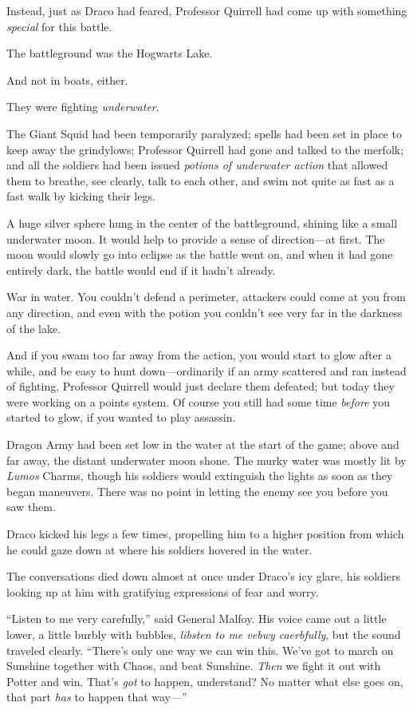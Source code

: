Instead, just as Draco had feared, Professor Quirrell had come up with something \emph{special} for this battle.

The battleground was the Hogwarts Lake.

And not in boats, either.

They were fighting \emph{underwater}.

The Giant Squid had been temporarily paralyzed; spells had been set in place to keep away the grindylows; Professor Quirrell had gone and talked to the merfolk; and all the soldiers had been issued \emph{potions of underwater action} that allowed them to breathe, see clearly, talk to each other, and swim not quite as fast as a fast walk by kicking their legs.

A huge silver sphere hung in the center of the battleground, shining like a small underwater moon. It would help to provide a sense of direction—at first. The moon would slowly go into eclipse as the battle went on, and when it had gone entirely dark, the battle would end if it hadn’t already.

War in water. You couldn’t defend a perimeter, attackers could come at you from any direction, and even with the potion you couldn’t see very far in the darkness of the lake.

And if you swam too far away from the action, you would start to glow after a while, and be easy to hunt down—ordinarily if an army scattered and ran instead of fighting, Professor Quirrell would just declare them defeated; but today they were working on a points system. Of course you still had some time \emph{before} you started to glow, if you wanted to play assassin.

Dragon Army had been set low in the water at the start of the game; above and far away, the distant underwater moon shone. The murky water was mostly lit by \emph{Lumos} Charms, though his soldiers would extinguish the lights as soon as they began maneuvers. There was no point in letting the enemy see you before you saw them.

Draco kicked his legs a few times, propelling him to a higher position from which he could gaze down at where his soldiers hovered in the water.

The conversations died down almost at once under Draco’s icy glare, his soldiers looking up at him with gratifying expressions of fear and worry.

“Listen to me very carefully,” said General Malfoy. His voice came out a little lower, a little burbly with bubbles, \emph{libsten to me vebwy caerbfully}, but the sound traveled clearly. “There’s only one way we can win this. We’ve got to march on Sunshine together with Chaos, and beat Sunshine. \emph{Then} we fight it out with Potter and win. That’s \emph{got} to happen, understand? No matter what else goes on, that part \emph{has} to happen that way—”

